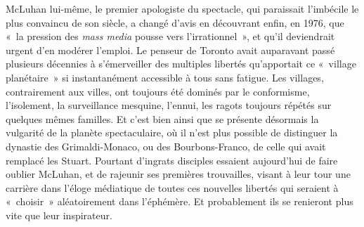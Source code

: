 \documentclass[french,twoside]{book} %
\def\bignobreak{\ifdim\lastskip<\bigskipamount
  \removelastskip\nopagebreak\bigskip\fi}
\newcommand{\labelblock}[1]{\bigbreak{\color{rubric}\noindent\textbf{#1}\par}\bignobreak}
\begin{document}
McLuhan lui-même, le premier apologiste du spectacle, qui paraissait l’imbécile le plus convaincu de son siècle, a changé d’avis en découvrant enfin, en 1976, que « la pression des \emph{mass media} pousse vers l’irrationnel », et qu’il deviendrait urgent d’en modérer l’emploi. Le penseur de Toronto avait auparavant passé plusieurs décennies à s’émerveiller des multiples libertés qu’apportait ce « village planétaire » si instantanément accessible à tous sans fatigue. Les villages, contrairement aux villes, ont toujours été dominés par le conformisme, l’isolement, la surveillance mesquine, l’ennui, les ragots toujours répétés sur quelques mêmes familles. Et c’est bien ainsi que se présente désormais la vulgarité de la planète spectaculaire, où il n’est plus possible de distinguer la dynastie des Grimaldi-Monaco, ou des Bourbons-Franco, de celle qui avait remplacé les Stuart. Pourtant d’ingrats disciples essaient aujourd’hui de faire oublier McLuhan, et de rajeunir ses premières trouvailles, visant à leur tour une carrière dans l’éloge médiatique de toutes ces nouvelles libertés qui seraient à « choisir » aléatoirement dans l’éphémère. Et probablement ils se renieront plus vite que leur inspirateur.\par

\labelblock{XIII}
\end{document}
